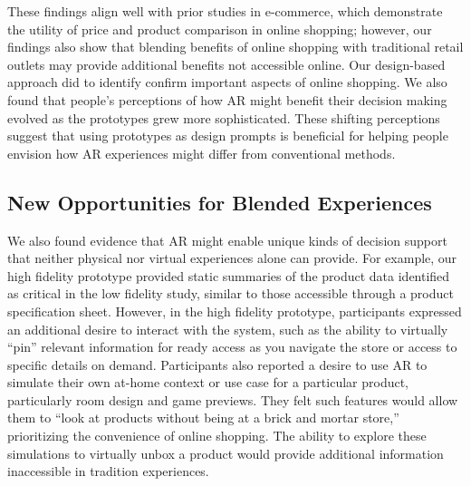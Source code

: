 These findings align well with prior studies in e-commerce, which demonstrate the utility of price and product comparison in online shopping; however, our findings also show that blending benefits of online shopping with traditional retail outlets may provide additional benefits not accessible online. Our design-based approach did to identify confirm important aspects of online shopping. We also found that people's perceptions of how AR might benefit their decision making evolved as the prototypes grew more sophisticated. These shifting perceptions suggest that using prototypes as design prompts is beneficial for helping people envision how AR experiences might differ from conventional methods. 

\subsection{New Opportunities for Blended Experiences}
We also found evidence that AR might enable unique kinds of decision support that neither physical nor virtual experiences alone can provide. For example, our high fidelity prototype provided static summaries of the product data identified as critical in the low fidelity study, similar to those accessible through a product specification sheet. However, in the high fidelity prototype, participants expressed an additional desire to interact with the system, such as the ability to virtually ``pin'' relevant information for ready access as you navigate the store or access to specific details on demand. 
Participants also reported a desire to use AR to simulate their own at-home context or use case for a particular product, particularly room design and game previews. They felt such features would allow them to ``look at products without being at a brick and mortar store,'' prioritizing the convenience of online shopping. The ability to explore these simulations to virtually unbox a product would provide additional information inaccessible in tradition experiences.

